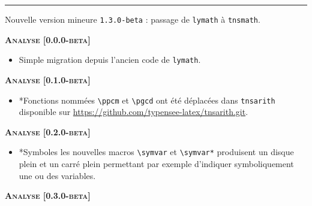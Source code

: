 \documentclass[12pt,a4paper]{book}
\makeatletter
\newcommand\env[1]{\texttt{#1}}
\newcommand\macro[1]{\env{\textbackslash{}#1}}
\theoremstyle{definition}
\newcommand\separation{
	\medskip
	\hfill\rule{0.5\textwidth}{0.75pt}\hfill
	\medskip
}
\newcommand\topic{\@ifstar{\@topic@star}{\@topic@no@star}}
\newcommand\@topic@no@star[1]{%
	\textbf{\textsc{#1}.}%
}
\newcommand\@topic@star[1]{%
	\textbf{\textsc{#1} :}%
}
\makeatother
\begin{document}
{{\begin{description}
\begin{itemize}[itemsep=.5em]
    
        
    
    \end{itemize}
    
    
    \separation


    \medskip
    \item[2020-07-21] Nouvelle version mineure \verb+1.3.0-beta+ : passage de \verb#lymath# à \verb#tnsmath#.
    
    
    
    
    \begin{center}
        \textbf{\textsc{Analyse [0.0.0-beta]}}
    \end{center}
    
    \begin{itemize}[itemsep=.5em]
        \item Simple migration depuis l'ancien code de \verb+lymath+.
    \end{itemize}
    
    
    \begin{center}
        \textbf{\textsc{Analyse [0.1.0-beta]}}
    \end{center}
    
    \begin{itemize}[itemsep=.5em]
        \item \topic*{Fonctions nommées} \macro{ppcm} et \macro{pgcd} ont été déplacées dans \texttt{tnsarith} disponible sur \url{https://github.com/typensee-latex/tnsarith.git}.
    \end{itemize}
    
    
    \begin{center}
        \textbf{\textsc{Analyse [0.2.0-beta]}}
    \end{center}
    
    \begin{itemize}[itemsep=.5em]
        \item \topic*{Symboles} les nouvelles macros \macro{symvar} et \macro{symvar*} produisent un disque plein et un carré plein permettant par exemple d'indiquer symboliquement une ou des variables.
        
        
    \end{itemize}
    
    
    \begin{center}
        \textbf{\textsc{Analyse [0.3.0-beta]}}
    \end{center}
    

\end{description}}}
\end{document}
